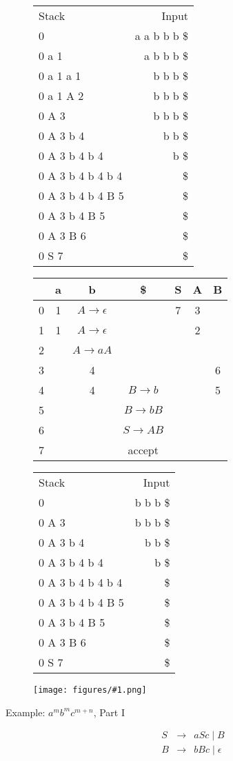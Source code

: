 \documentclass[12pt]{article}
\newcommand{\myfig}[1]{\texttt{[image: figures/\#1.png]}}
\newcommand{\mt}{\ensuremath{\epsilon}}
\begin{document}
\begin{description}
\begin{tabular}{lr}
Stack & Input \\
0 & a a b b b \$\\
0 a 1 & a b b b \$\\
0 a 1 a 1 & b b b \$\\
0 a 1 A 2 & b b b \$\\
0 A 3 & b b b  \$\\
0 A 3 b 4 &  b b \$\\
0 A 3 b 4 b 4 & b \$\\
0 A 3 b 4 b 4 b 4 & \$\\
0 A 3 b 4 b 4 B 5 & \$\\
0 A 3 b 4 B 5 &  \$\\
0 A 3 B 6 &  \$\\
0 S 7 & \$\\
\end{tabular}
\begin{tabular}{|c|c|c|c|c|c|c|}\hline
 & a & b & \$ & S & A & B \\\hline
0 & 1 & $A\rightarrow\mt$&&7&3&\\\hline
1 & 1 & $A\rightarrow\mt$&&&2&\\\hline
2 &&$A\rightarrow aA$&&&&\\\hline
3 &&4&&&&6\\\hline
4 &&4&$B\rightarrow b$&&&5\\\hline
5 &&&$B\rightarrow bB$&&&\\\hline
6 &&&$S\rightarrow AB$&&&\\\hline
7 &&&accept&&&\\\hline
\end{tabular}


\begin{tabular}{lr}
Stack & Input \\
0 & b b b \$\\
0 A 3 & b b b \$\\
0 A 3 b 4 & b b \$\\
0 A 3 b 4 b 4 & b \$\\
0 A 3 b 4 b 4  b 4 & \$\\
0 A 3 b 4 b 4  B 5 & \$\\
0 A 3 b 4 B 5 & \$\\
0 A 3 B 6 & \$\\
0 S 7 & \$\\
\end{tabular}
\myfig{lrparseexamples04}

\newpage
\item[Example: $a^mb^mc^{m+n}$, Part I]
\begin{eqnarray*}
S &\rightarrow& aSc \mid B \\
B &\rightarrow& bBc \mid  \mt
\end{eqnarray*}


\end{description}
\end{document}
